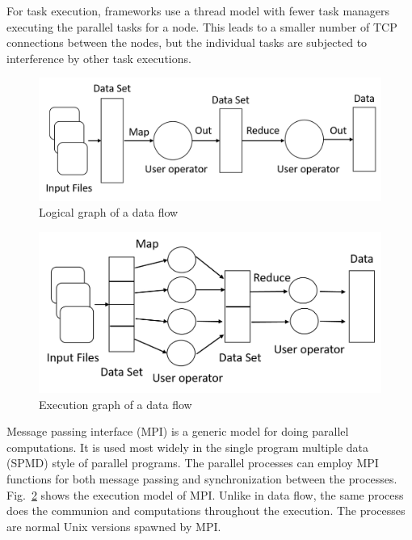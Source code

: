 \documentclass[conference]{IEEEtran}
\begin{document}
For task execution, frameworks use a thread model with fewer task managers executing the parallel tasks for a node. This leads to a smaller number of TCP connections between the nodes, but the individual tasks are subjected to interference by other task executions. 

\begin{figure}
    \centering
    \includegraphics[width=0.95\columnwidth]{images/logical_graph.png}
    \caption{Logical graph of a data flow}
    \label{fig:logical_graph}
\end{figure}

\begin{figure}
    \centering
    \includegraphics[width=0.95\columnwidth]{images/execution_graphs.png}
    \caption{Execution graph of a data flow}
    \label{fig:execution_graph}
\end{figure}

Message passing interface (MPI) is a generic model for doing parallel computations. It is used most widely in the single program multiple data (SPMD) style of parallel programs. The parallel processes can employ MPI functions for both message passing and synchronization between the processes. Fig.~\ref{fig:execution_graph} shows the execution model of MPI. Unlike in data flow, the same process does the communion and computations throughout the execution. The processes are normal Unix versions spawned by MPI. 
\end{document}

